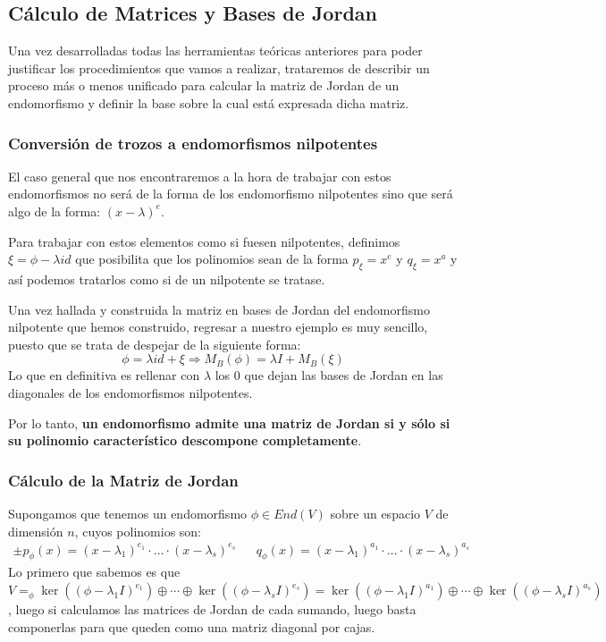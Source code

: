 \documentclass[10pt,a4paper,openright]{book}
\theoremstyle{break}
\begin{document}
\subsection{Cálculo de Matrices y Bases de Jordan}
Una vez desarrolladas todas las herramientas teóricas anteriores para poder justificar los procedimientos que vamos a realizar, trataremos de describir un proceso más o menos unificado para calcular la matriz de Jordan de un endomorfismo y definir la base sobre la cual está expresada dicha matriz.


\subsubsection{Conversión de trozos a endomorfismos nilpotentes}
\label{Conversion a nilpotentes}
El caso general que nos encontraremos a la hora de trabajar con estos endomorfismos no será de la forma de los endomorfismo nilpotentes sino que será algo de la forma: $(x-\lambda)^e$.

Para trabajar con estos elementos como si fuesen nilpotentes, definimos $\xi = \phi- \lambda id$ que posibilita que los polinomios sean de la forma $p_\xi = x^e$ y $q_\xi = x^a$ y así podemos tratarlos como si de un nilpotente se tratase.

Una vez hallada y construida la matriz en bases de Jordan del endomorfismo nilpotente que hemos construido, regresar a nuestro ejemplo es muy sencillo, puesto que se trata de despejar de la siguiente forma:
$$\phi = \lambda id +\xi\Rightarrow M_B(\phi)=\lambda I +M_B(\xi)$$ 
Lo que en definitiva es rellenar con $\lambda$ los $0$ que dejan las bases de Jordan en las diagonales de los endomorfismos nilpotentes.

Por lo tanto, \textbf{un endomorfismo admite una matriz de Jordan si y sólo si su polinomio característico descompone completamente}.

\subsubsection{Cálculo de la Matriz de Jordan}
\label{Matriz Jordan}
Supongamos que tenemos un endomorfismo $\phi\in End(V)$ sobre un espacio $V$ de dimensión $n$, cuyos polinomios son:
\begin{align*}
\pm p_\phi(x)= (x-\lambda_1)^{e_1}\cdot \ldots \cdot (x-\lambda_s)^{e_s} & & q_\phi(x)= (x-\lambda_1)^{a_1}\cdot \ldots \cdot (x-\lambda_s)^{a_s}
\end{align*}
Lo primero que sabemos es que $V=_\phi \ker\left((\phi-\lambda_1I)^{e_1}\right) \oplus \cdots \oplus \ker\left((\phi-\lambda_sI)^{e_s}\right) = \ker\left((\phi-\lambda_1I)^{a_1}\right) \oplus \cdots \oplus \ker\left((\phi-\lambda_sI)^{a_s}\right)$, luego si calculamos las matrices de Jordan de cada sumando, luego basta componerlas para que queden como una matriz diagonal por cajas.
\end{document}
